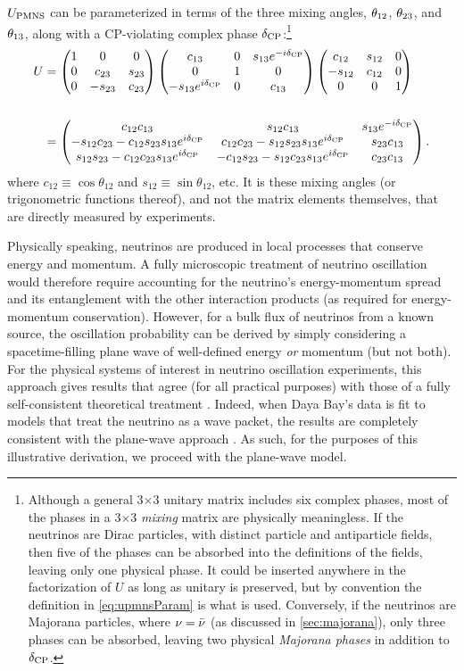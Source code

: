 \documentclass[../thesis.tex]{subfiles}
\begin{document}
$U_\mathrm{PMNS}$ can be parameterized in terms of the three mixing angles, $\theta_{12}$, $\theta_{23}$, and $\theta_{13}$, along with a CP-violating complex phase $\delta_\text{CP}$:\footnote{Although a general 3$\times$3 unitary matrix includes six complex phases, most of the phases in a 3$\times$3 \emph{mixing} matrix are physically meaningless. If the neutrinos are Dirac particles, with distinct particle and antiparticle fields, then five of the phases can be absorbed into the definitions of the fields, leaving only one physical phase. It could be inserted anywhere in the factorization of $U$ as long as unitary is preserved, but by convention the definition in \autoref{eq:upmnsParam} is what is used. Conversely, if the neutrinos are Majorana particles, where $\nu = \bar\nu$ (as discussed in \autoref{sec:majorana}), only three phases can be absorbed, leaving two physical \emph{Majorana phases} in addition to $\delta_\text{CP}$.}
\begin{align}
  \label{eq:upmnsParam}
  \begin{split}
    U &= \begin{pmatrix} 1 & 0 & 0 \\ 0 & c_{23} & s_{23} \\ 0 & -s_{23} & c_{23} \end{pmatrix} \begin{pmatrix} c_{13} & 0 & s_{13}e^{-i\delta_\text{CP}} \\ 0 & 1 & 0 \\ -s_{13}e^{i\delta_\text{CP}} & 0 & c_{13} \end{pmatrix} \begin{pmatrix} c_{12} & s_{12} & 0 \\ -s_{12} & c_{12} & 0 \\ 0 & 0 & 1 \end{pmatrix} \\\\
    &= \begin{pmatrix} c_{12}c_{13} & s_{12} c_{13} & s_{13}e^{-i\delta_\text{CP}} \\ -s_{12}c_{23} - c_{12}s_{23}s_{13}e^{i\delta_\text{CP}} & c_{12}c_{23} - s_{12}s_{23}s_{13}e^{i\delta_\text{CP}} & s_{23}c_{13}\\s_{12}s_{23} - c_{12}c_{23}s_{13}e^{i\delta_\text{CP}} & -c_{12}s_{23} - s_{12}c_{23}s_{13}e^{i\delta_\text{CP}} & c_{23}c_{13} \end{pmatrix}.
  \end{split}
\end{align}
where \(c_{12} \equiv \cos\theta_{12}\) and \(s_{12} \equiv \sin\theta_{12}\), etc. It is these mixing angles (or trigonometric functions thereof), and not the matrix elements themselves, that are directly measured by experiments.

Physically speaking, neutrinos are produced in local processes that conserve energy and momentum. A fully microscopic treatment of neutrino oscillation would therefore require accounting for the neutrino's energy-momentum spread and its entanglement with the other interaction products (as required for energy-momentum conservation). However, for a bulk flux of neutrinos from a known source, the oscillation probability can be derived by simply considering a spacetime-filling plane wave of well-defined energy \emph{or} momentum (but not both). For the physical systems of interest in neutrino oscillation experiments, this approach gives results that agree (for all practical purposes) with those of a fully self-consistent theoretical treatment \cite{Ligeti}. Indeed, when Daya Bay's data is fit to models that treat the neutrino as a wave packet, the results are completely consistent with the plane-wave approach \cite{DayaBayWavePacket}. As such, for the purposes of this illustrative derivation, we proceed with the plane-wave model.
\end{document}
